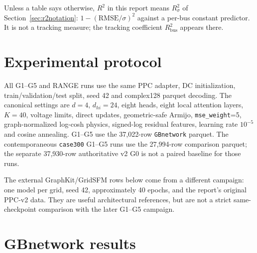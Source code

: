 \documentclass[10pt]{article}
\begin{document}
Unless a table says otherwise, $R^2$ in this report means $R^2_{\sigma}$ of
Section~\ref{sec:r2notation}: $1-(\mathrm{RMSE}/\sigma)^2$ against a per-bus
constant predictor.  It is not a tracking measure; the tracking coefficient
$R^2_{\mathrm{bus}}$ appears there.

\section{Experimental protocol}

All G1--G5 and RANGE runs use the same PPC adapter, DC initialization,
train/validation/test split, seed 42 and complex128 parquet decoding.  The
canonical settings are $d=4$, $d_{hi}=24$, eight heads, eight local attention
layers, $K=40$, voltage limits, direct updates, geometric-safe Armijo,
\texttt{mse\_weight}=5, graph-normalized log-cosh physics, signed-log residual
features, learning rate $10^{-5}$ and cosine annealing.  G1--G5 use the
37,022-row \texttt{GBnetwork} parquet.  The contemporaneous \texttt{case300}
G1--G5 runs use the 27,994-row comparison parquet; the separate 37,930-row
authoritative v2 G0 is not a paired baseline for those runs.

The external GraphKit/GridSFM rows below come from a different campaign: one
model per grid, seed 42, approximately 40 epochs, and the report's original
PPC-v2 data.  They are useful architectural references, but are not a strict
same-checkpoint comparison with the later G1--G5 campaign.

\section{GBnetwork results}
\end{document}
